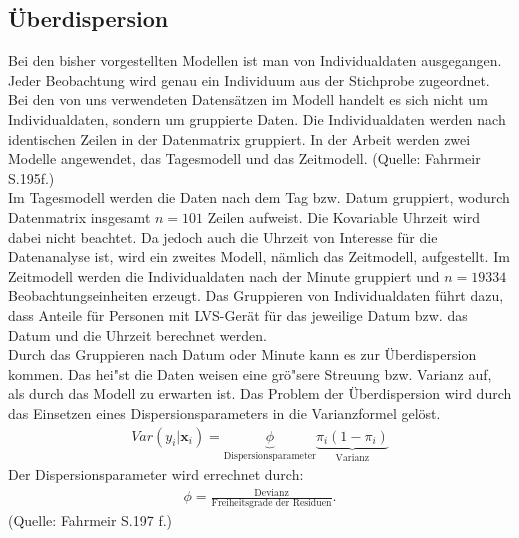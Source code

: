 \subsection{Überdispersion}
Bei den bisher vorgestellten Modellen ist man von Individualdaten ausgegangen. Jeder Beobachtung wird genau ein Individuum aus der Stichprobe zugeordnet.
Bei den von uns verwendeten Datensätzen im Modell handelt es sich nicht um Individualdaten, sondern um gruppierte Daten. Die Individualdaten werden nach identischen Zeilen in der Datenmatrix gruppiert. In der Arbeit werden zwei Modelle angewendet, das Tagesmodell und das Zeitmodell. (Quelle: Fahrmeir S.195f.) \\
Im Tagesmodell werden die Daten nach dem Tag bzw. Datum gruppiert, wodurch Datenmatrix insgesamt $n = 101$ Zeilen aufweist. Die Kovariable Uhrzeit wird dabei nicht beachtet. Da jedoch auch die Uhrzeit von Interesse für die Datenanalyse ist, wird ein zweites Modell, nämlich das Zeitmodell, aufgestellt. Im Zeitmodell werden die Individualdaten nach der Minute gruppiert und $n = 19334$ Beobachtungseinheiten erzeugt. Das Gruppieren von Individualdaten führt dazu, dass Anteile für Personen mit LVS-Gerät für das jeweilige Datum bzw. das Datum und die Uhrzeit berechnet werden. \\
Durch das Gruppieren nach Datum oder Minute kann es zur Überdispersion kommen. Das hei"st die Daten weisen eine grö"sere Streuung bzw. Varianz auf, als durch das Modell zu erwarten ist. Das Problem der Überdispersion wird durch das Einsetzen eines Dispersionsparameters in die Varianzformel gelöst.
\begin{align}
Var(y_{i}|\textbf{x}_{i})=\underbrace{\phi}_\text{Dispersionsparameter} \underbrace{\pi_{i}(1-\pi_{i})}_\text{Varianz}
\end{align}
Der Dispersionsparameter wird errechnet durch:
\begin{align}
\phi=\frac{\text{Devianz}}{\text{Freiheitsgrade der Residuen}}.
\end{align} 
(Quelle: Fahrmeir S.197 f.)

